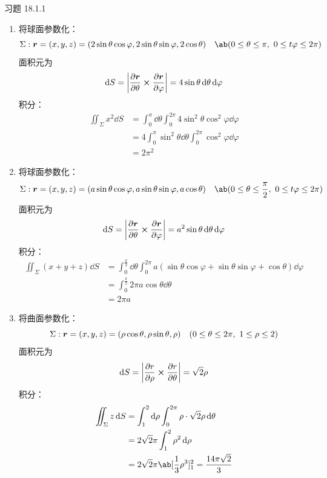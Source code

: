 \begin{problem}
	习题 18.1.1
	\begin{solution}
		\begin{enumerate}
			\item[\textbf{1)}] 将球面参数化：
			$$
			\Sigma: \vect{r} = (x, y, z) = (2 \sin \theta \cos \varphi, 2 \sin \theta \sin \varphi, 2 \cos \theta) \quad \ab(0 \le \theta \le \pi,\ 0 \le t \varphi \le 2\pi)
			$$
			面积元为
			$$
			\dd{S} = \abs{\pdv{\vect{r}}{\theta} \cp \pdv{\vect{r}}{\varphi}} = 4 \sin \theta \dd{\theta} \dd{\varphi}
			$$
			积分：
			$$
			\begin{aligned}
				\iint_{\Sigma} x^2 \dd{S} & = \int_{0}^{\pi} \dd{\theta} \int_{0}^{2\pi} 4 \sin^2 \theta \cos^2 \varphi \dd{\varphi} \\
				& = 4 \int_{0}^{\pi} \sin^2 \theta \dd{\theta} \int_{0}^{2\pi} \cos^2 \varphi \dd{\varphi} \\
				& = 2 \pi^2
			\end{aligned}
			$$

			\item[\textbf{3)}] 将球面参数化：
			$$
			\Sigma: \vect{r} = (x, y, z) = (a \sin \theta \cos \varphi, a \sin \theta \sin \varphi, a \cos \theta) \quad \ab(0 \le \theta \le \frac{\pi}{2},\ 0 \le t \varphi \le 2\pi)
			$$
			面积元为
			$$
			\dd{S} = \abs{\pdv{\vect{r}}{\theta} \cp \pdv{\vect{r}}{\varphi}} = a^2 \sin \theta \dd{\theta} \dd{\varphi}
			$$
			积分：
			$$
			\begin{aligned}
				\iint_{\Sigma} (x + y + z) \dd{S} & = \int_{0}^{\frac{\pi}{2}} \dd{\theta} \int_{0}^{2\pi} a (\sin \theta \cos \varphi + \sin \theta \sin \varphi + \cos \theta) \dd{\varphi} \\
				& = \int_{0}^{\frac{\pi}{2}} 2 \pi a \cos \theta \dd{\theta} \\
				& = 2 \pi a
			\end{aligned}
			$$

			\item[\textbf{5)}] 将曲面参数化：
			$$
			\Sigma: \boldsymbol{r} = (x, y, z) = (\rho \cos \theta, \rho \sin \theta, \rho) \quad (0 \le \theta \le 2\pi,\ 1 \le \rho \le 2)
			$$
			面积元为
			$$
			\dd{S} = \abs{\pdv{r}{\rho} \cp \pdv{r}{\theta}} = \sqrt{2} \rho
			$$
			积分：
			$$
			\begin{aligned}
				\iint_{\Sigma} z \dd{S} & = \int_{1}^{2} \dd{\rho} \int_{0}^{2\pi} \rho \cdot \sqrt{2} \rho \dd{\theta} \\
				& = 2 \sqrt{2} \pi \int_{1}^{2} \rho^2 \dd{\rho} \\
				& = 2 \sqrt{2} \pi \ab[\frac{1}{3} \rho^3]_{1}^{2} = \frac{14\pi \sqrt{2}}{3}
			\end{aligned}
			$$


\end{enumerate}
\end{solution}
\end{problem}
